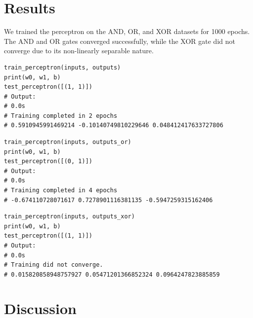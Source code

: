 \documentclass[a4paper, journal]{IEEEtran}
\begin{document}
\section{Results}
We trained the perceptron on the AND, OR, and XOR datasets for 1000 epochs. The AND and OR gates converged successfully, while the XOR gate did not converge due to its non-linearly separable nature.


\begin{lstlisting}[caption={Training Perceptron on AND Gate}]
train_perceptron(inputs, outputs)
print(w0, w1, b)
test_perceptron([(1, 1)])
# Output:
# 0.0s
# Training completed in 2 epochs
# 0.5910945991469214 -0.10140749810229646 0.048412417633727806
\end{lstlisting}


\begin{lstlisting}[caption={Training Perceptron on OR Gate}]
train_perceptron(inputs, outputs_or)
print(w0, w1, b)
test_perceptron([(0, 1)])
# Output:
# 0.0s
# Training completed in 4 epochs
# -0.674110728071617 0.7278901116381135 -0.5947259315162406
\end{lstlisting}

\begin{lstlisting}[caption={Training Perceptron on XOR Gate}]
train_perceptron(inputs, outputs_xor)
print(w0, w1, b)
test_perceptron([(1, 1)])
# Output:
# 0.0s
# Training did not converge.
# 0.015820858948757927 0.05471201366852324 0.0964247823885859
\end{lstlisting}





\section*{Discussion}
\end{document}
